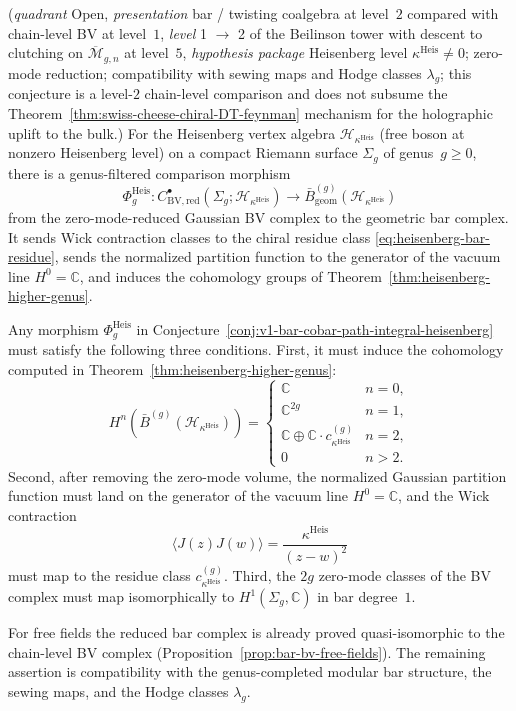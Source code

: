 \begin{conjecture}\label{conj:v1-bar-cobar-path-integral-heisenberg}
\textup{(}\emph{quadrant} Open, \emph{presentation} bar / twisting
coalgebra at level~$2$ compared with chain-level BV at level~$1$,
\emph{level} 1 $\to$ 2 of the Beilinson tower with descent to clutching
on $\overline{\mathcal{M}}_{g,n}$ at level~$5$,
\emph{hypothesis package} Heisenberg level
$\kappa^{\mathrm{Heis}} \neq 0$; zero-mode reduction; compatibility
with sewing maps and Hodge classes $\lambda_g$; this conjecture is a
level-$2$ chain-level comparison and does not subsume the
Theorem~\ref{thm:swiss-cheese-chiral-DT-feynman} mechanism for the
holographic uplift to the bulk.\textup{)}
For the Heisenberg vertex algebra $\mathcal{H}_{\kappa^{\mathrm{Heis}}}$
\textup{(}free boson at nonzero Heisenberg level\textup{)} on a
compact Riemann surface $\Sigma_g$ of genus~$g \geq 0$, there is a
genus-filtered comparison morphism
\[
\Phi_g^{\mathrm{Heis}}\colon
C^\bullet_{\mathrm{BV,red}}(\Sigma_g;\mathcal{H}_{\kappa^{\mathrm{Heis}}})
\longrightarrow
\bar{B}_{\mathrm{geom}}^{(g)}(\mathcal{H}_{\kappa^{\mathrm{Heis}}})
\]
from the zero-mode-reduced Gaussian BV complex to the geometric bar
complex.  It sends Wick contraction classes to the chiral residue
class \eqref{eq:heisenberg-bar-residue}, sends the normalized
partition function to the generator of the vacuum line
$H^0=\mathbb{C}$, and induces the cohomology groups of
Theorem~\ref{thm:heisenberg-higher-genus}.
\end{conjecture}

\begin{remark}
Any morphism
$\Phi_g^{\mathrm{Heis}}$ in
Conjecture~\ref{conj:v1-bar-cobar-path-integral-heisenberg} must
satisfy the following three conditions. First, it must induce the
cohomology computed in Theorem~\ref{thm:heisenberg-higher-genus}:
\[
H^n(\bar{B}^{(g)}(\mathcal{H}_{\kappa^{\mathrm{Heis}}})) = \begin{cases}
\mathbb{C} & n = 0, \\
\mathbb{C}^{2g} & n = 1, \\
\mathbb{C} \oplus \mathbb{C} \cdot c_{\kappa^{\mathrm{Heis}}}^{(g)} & n = 2, \\
0 & n > 2.
\end{cases}
\]
Second, after removing the zero-mode volume, the normalized Gaussian
partition function must land on the generator of the vacuum line
$H^0=\mathbb C$, and the Wick contraction
\[
\langle J(z)J(w)\rangle=\frac{\kappa^{\mathrm{Heis}}}{(z-w)^2}
\]
must map to the residue class
$c_{\kappa^{\mathrm{Heis}}}^{(g)}$. Third, the $2g$ zero-mode
classes of the BV complex must map isomorphically to
$H^1(\Sigma_g,\mathbb C)$ in bar degree~$1$.

For free fields the reduced bar complex is already proved
quasi-isomorphic to the chain-level BV complex
(Proposition~\ref{prop:bar-bv-free-fields}). The remaining assertion
is compatibility with the genus-completed modular bar structure, the
sewing maps, and the Hodge classes $\lambda_g$.
\end{remark}


